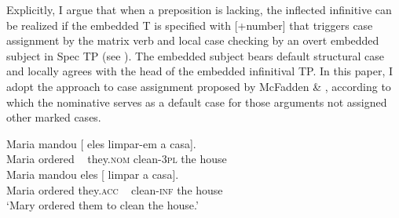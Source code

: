 \documentclass[output=paper]{langsci/langscibook}
\begin{document}
Explicitly, I argue that when a preposition is lacking, the inflected infinitive can be realized if the embedded T is specified with [+number] that triggers case assignment by the matrix verb and local case checking by an overt embedded subject in Spec TP (see \citealt{Raposo1987}). The embedded subject bears default structural case and locally agrees with the head of the embedded infinitival TP. In this paper, I adopt the approach to case assignment proposed by McFadden \& \citet{Sundaresan2011}, according to which the nominative serves as a default case for those arguments not assigned other marked cases.

\ea%
    \label{ex:moreno:28}
    \ea
    \gll Maria mandou [ eles          limpar-em   a     casa].    \\
         Maria ordered  ~ they.\textsc{nom}   clean-\textsc{3pl}     the house\\
    \ex  
    \gll Maria mandou   eles [  limpar      a    casa]. \\
         Maria ordered   they.\textsc{acc}  ~ clean-\textsc{inf} the house \\
    \glt ‘Mary ordered them to clean the house.’
    \z
\z
\end{document}
